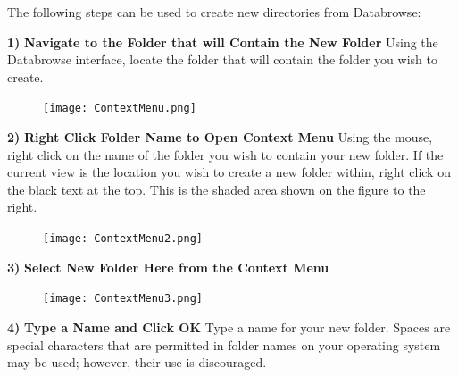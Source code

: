 \documentclass[10pt]{article}
\begin{document}
The following steps can be used to create new directories from Databrowse:

\begin{changemargin}{0in}{150.4pt}
\noindent\textbf{1)} \textbf{Navigate to the Folder that will Contain the New Folder} \newline Using the Databrowse interface, locate the folder that will contain the folder you wish to create.
\end{changemargin}

\begingroup
\setlength\intextsep{0pt}
\begin{figure}
		\texttt{[image: ContextMenu.png]}
\end{figure}
\noindent\textbf{2)} \textbf{Right Click Folder Name to Open Context Menu} \newline Using the mouse, right click on the name of the folder you wish to contain your new folder.  If the current view is the location you wish to create a new folder within, right click on the black text at the top.  This is the shaded area shown on the figure to the right.

\endgroup

\hfill \break
\hfill \break
\hfill \break
\hfill \break
\hfill \break
\hfill \break
\hfill \break

\begingroup
\setlength\intextsep{0pt}
\begin{figure}
		\texttt{[image: ContextMenu2.png]}
\end{figure}
\noindent\textbf{3)} \textbf{Select New Folder Here from the Context Menu}

\endgroup

\hfill \break
\hfill \break
\hfill \break
\hfill \break
\hfill \break
\hfill \break
\hfill \break
\hfill \break
\hfill \break
\hfill \break
\hfill \break

\begingroup
\setlength\intextsep{0pt}
\begin{figure}
		\texttt{[image: ContextMenu3.png]}
\end{figure}
\noindent\textbf{4)} \textbf{Type a Name and Click OK} \newline Type a name for your new folder.  Spaces are special characters that are permitted in folder names on your operating system may be used; however, their use is discouraged.

\endgroup

\hfill \break
\hfill \break
\hfill \break
\hfill \break
\hfill \break
\hfill \break
\hfill \break
\hfill \break
\end{document}
